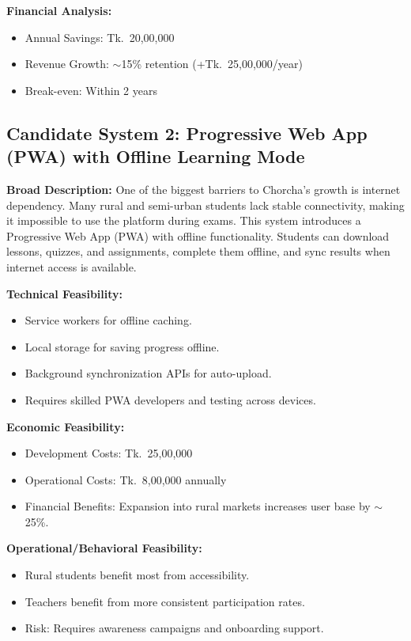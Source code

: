 \documentclass[12pt,a4paper,oneside]{book}
\begin{document}
\textbf{Financial Analysis:}
\begin{itemize}
    \item Annual Savings: Tk.~20,00,000
    \item Revenue Growth: $\sim$15\% retention (+Tk.~25,00,000/year)
    \item Break-even: Within 2 years
\end{itemize}

\subsection{Candidate System 2: Progressive Web App (PWA) with Offline Learning Mode}

\textbf{Broad Description:}
One of the biggest barriers to Chorcha’s growth is internet dependency. Many rural and semi-urban students lack stable connectivity, making it impossible to use the platform during exams. This system introduces a Progressive Web App (PWA) with offline functionality. Students can download lessons, quizzes, and assignments, complete them offline, and sync results when internet access is available.

\textbf{Technical Feasibility:}
\begin{itemize}
    \item Service workers for offline caching.
    \item Local storage for saving progress offline.
    \item Background synchronization APIs for auto-upload.
    \item Requires skilled PWA developers and testing across devices.
\end{itemize}

\textbf{Economic Feasibility:}
\begin{itemize}
    \item Development Costs: Tk.~25,00,000
    \item Operational Costs: Tk.~8,00,000 annually
    \item Financial Benefits: Expansion into rural markets increases user base by $\sim$25\%.
\end{itemize}

\textbf{Operational/Behavioral Feasibility:}
\begin{itemize}
    \item Rural students benefit most from accessibility.
    \item Teachers benefit from more consistent participation rates.
    \item Risk: Requires awareness campaigns and onboarding support.
\end{itemize}
\end{document}
